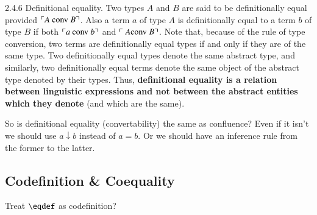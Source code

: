 \vspace{2ex}

\begin{displayquote} 2.4.6 Definitional equality. Two types \(A\) and \(B\) are
  said to be {\upshape definitionally equal} provided \(\ulcorner
  A\ \text{\upshape conv}\ B\urcorner\). Also a term \(a\) of type
  \(A\) is definitionally equal to a term \(b\) of type \(B\) if both
  \(\ulcorner a\ \text{\upshape conv}\ b\urcorner\) and \(\ulcorner\ A
  \text{\upshape conv}\ B\urcorner\). Note that, because of the rule of type
  conversion, two terms are definitionally equal types if and only if
  they are of the same type. Two definitionally equal types denote the
  same abstract type, and similarly, two definitionally equal terms
  denote the same object of the abstract type denoted by their types.
  Thus, \textbf{definitional equality is a relation between linguistic
    expressions and not between the abstract entities which they
    denote} (and which are the same).
\end{displayquote}

So is definitional equality (convertability) the same as confluence?
Even if it isn't we should use \(a\downarrow b\) instead of \(a = b\).
Or we should have an inference rule from the former to the latter.

\subsection{Codefinition \& Coequality}

Treat \(\defeq\) as codefinition?

